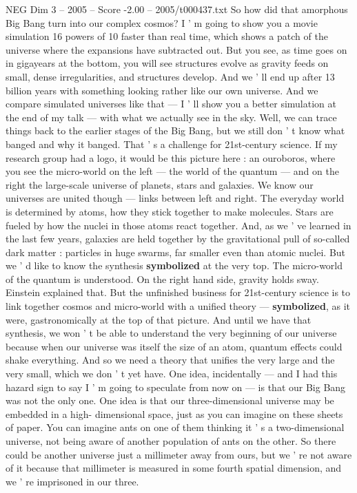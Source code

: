 \begin{textsample}{NEG Dim 3 – 2005 – Score -2.00 – 2005/t000437.txt}
So how did that amorphous Big Bang turn into our complex cosmos?
I ' m going to show you a movie simulation 16 powers of 10 faster than real time, which shows a patch of the universe where the expansions have subtracted out.
But you see, as time goes on in gigayears at the bottom, you will see structures evolve as gravity feeds on small, dense irregularities, and structures develop.
And we ' ll end up after 13 billion years with something looking rather like our own universe.
And we compare simulated universes like that — I ' ll show you a better simulation at the end of my talk — with what we actually see in the sky.
Well, we can trace things back to the earlier stages of the Big Bang, but we still don ' t know what banged and why it banged.
That ' s a challenge for 21st-century science.
If my research group had a logo, it would be this picture here : an ouroboros, where you see the micro-world on the left — the world of the quantum — and on the right the large-scale universe of planets, stars and galaxies.
We know our universes are united though — links between left and right.
The everyday world is determined by atoms, how they stick together to make molecules.
Stars are fueled by how the nuclei in those atoms react together.
And, as we ' ve learned in the last few years, galaxies are held together by the gravitational pull of so-called dark matter : particles in huge swarms, far smaller even than atomic nuclei.
But we ' d like to know the synthesis \textbf{symbolized} at the very top.
The micro-world of the quantum is understood.
On the right hand side, gravity holds sway.
Einstein explained that.
But the unfinished business for 21st-century science is to link together cosmos and micro-world with a unified theory — \textbf{symbolized}, as it were, gastronomically at the top of that picture.
And until we have that synthesis, we won ' t be able to understand the very beginning of our universe because when our universe was itself the size of an atom, quantum effects could shake everything.
And so we need a theory that unifies the very large and the very small, which we don ' t yet have.
One idea, incidentally — and I had this hazard sign to say I ' m going to speculate from now on — is that our Big Bang was not the only one.
One idea is that our three-dimensional universe may be embedded in a high- dimensional space, just as you can imagine on these sheets of paper.
You can imagine ants on one of them thinking it ' s a two-dimensional universe, not being aware of another population of ants on the other.
So there could be another universe just a millimeter away from ours, but we ' re not aware of it because that millimeter is measured in some fourth spatial dimension, and we ' re imprisoned in our three.

\end{textsample}
